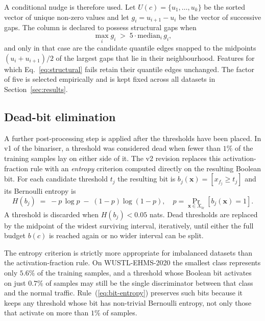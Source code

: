 \documentclass[journal,10pt]{IEEEtran}
\begin{document}
A conditional nudge is therefore used. Let $U(c) = \{u_1,\dots,u_k\}$
be the sorted vector of unique non-zero values and let
$g_i = u_{i+1} - u_i$ be the vector of successive gaps. The column is
declared to possess structural gaps when
\begin{equation}
  \max_i g_i \;>\; 5 \cdot \mathrm{median}_i\,g_i,
  \label{eq:structural}
\end{equation}
and only in that case are the candidate quantile edges snapped to
the midpoints $(u_i + u_{i+1})/2$ of the largest gaps that lie in
their neighbourhood. Features for which
Eq.~\ref{eq:structural} fails retain their quantile edges unchanged.
The factor of five is selected empirically and is kept fixed across
all datasets in Section~\ref{sec:results}.

\subsection{Dead-bit elimination}
\label{sec:glade-dead}
A further post-processing step is applied after the thresholds have
been placed. In v1 of the binariser, a threshold was considered
dead when fewer than $1\%$ of the training samples lay on either
side of it. The v2 revision replaces this activation-fraction rule
with an \emph{entropy} criterion computed directly on the resulting
Boolean bit. For each candidate threshold $t_j$ the resulting bit
is $b_j(\mathbf{x}) = [x_{f_j} \ge t_j]$ and its Bernoulli entropy
is
\begin{equation}
  H(b_j) \;=\; -p\,\log p \;-\; (1-p)\log(1-p),
  \quad p = \Pr_{\mathbf{x}\in X_{\text{tr}}}[b_j(\mathbf{x})=1].
  \label{eq:bit-entropy}
\end{equation}
A threshold is discarded when $H(b_j) < 0.05$ nats. Dead thresholds
are replaced by the midpoint of the widest surviving interval,
iteratively, until either the full budget $b(c)$ is reached again or
no wider interval can be split.

The entropy criterion is strictly more appropriate for imbalanced
datasets than the activation-fraction rule. On WUSTL-EHMS-2020 the
smallest class represents only $5.6\%$ of the training samples, and
a threshold whose Boolean bit activates on just $0.7\%$ of samples
may still be the single discriminator between that class and the
normal traffic. Rule~(\ref{eq:bit-entropy}) preserves such bits
because it keeps any threshold whose bit has non-trivial Bernoulli
entropy, not only those that activate on more than $1\%$ of samples.
\end{document}
